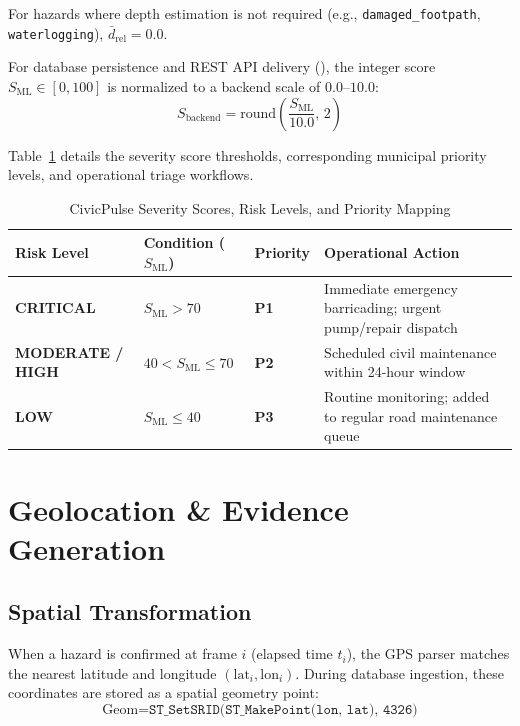 \documentclass[12pt,a4paper]{article}
\begin{document}
For hazards where depth estimation is not required (e.g., \texttt{damaged\_footpath}, \texttt{waterlogging}), $\bar{d}_{\text{rel}} = 0.0$.

For database persistence and REST API delivery (), the integer score $S_{\text{ML}} \in [0, 100]$ is normalized to a backend scale of $0.0$--$10.0$:
\begin{equation}
S_{\text{backend}} = \text{round}\left(\frac{S_{\text{ML}}}{10.0}, \, 2\right)
\end{equation}

Table~\ref{tab:severity_rules} details the severity score thresholds, corresponding municipal priority levels, and operational triage workflows.

\begin{table}[htbp]
\centering
\small
\caption{CivicPulse Severity Scores, Risk Levels, and Priority Mapping}
\label{tab:severity_rules}
\begin{tabularx}{\textwidth}{l l l X}
\toprule
\textbf{Risk Level} & \textbf{Condition ($S_{\text{ML}}$)} & \textbf{Priority} & \textbf{Operational Action} \\
\midrule
\textbf{CRITICAL} & $S_{\text{ML}} > 70$ & \textbf{P1} & Immediate emergency barricading; urgent pump/repair dispatch \\
\textbf{MODERATE / HIGH} & $40 < S_{\text{ML}} \le 70$ & \textbf{P2} & Scheduled civil maintenance within 24-hour window \\
\textbf{LOW} & $S_{\text{ML}} \le 40$ & \textbf{P3} & Routine monitoring; added to regular road maintenance queue \\
\bottomrule
\end{tabularx}
\end{table}

\section{Geolocation \& Evidence Generation}

\subsection{Spatial Transformation}
When a hazard is confirmed at frame $i$ (elapsed time $t_i$), the GPS parser matches the nearest latitude and longitude $(\text{lat}_i, \text{lon}_i)$. During database ingestion, these coordinates are stored as a spatial geometry point:
\begin{equation}
\text{Geom} = \texttt{ST\_SetSRID(ST\_MakePoint(lon, lat), 4326)}
\end{equation}
\end{document}
